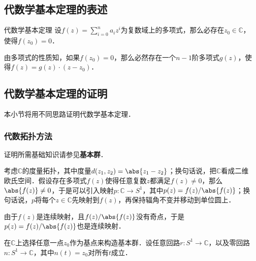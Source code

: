 

\subsection{代数学基本定理的表述}

\begin{definition}{代数学基本定理}
设$f(z)=\sum\limits_{i=0}^n a_iz^i$为复数域上的多项式，那么必存在$z_0\in\mathbb{C}$，使得$f(z_0)=0$．
\end{definition}

由多项式的性质知，如果$f(z_0)=0$，那么必然存在一个$n-1$阶多项式$g(z)$，使得$f(z)=g(z)\cdot(z-z_0)$．

\subsection{代数学基本定理的证明}

本小节将用不同思路证明代数学基本定理．

\subsubsection{代数拓扑方法}
证明所需基础知识请参见\textbf{基本群}．

考虑$\mathbb{C}$的度量拓扑，其中度量$d(z_1, z_2)=\abs{z_1-z_2}$；换句话说，把$\mathbb{C}$看成二维欧氏空间．假设存在多项式$f(z)$使得任意复数$z$都满足$f(z)\not=0$，那么$\abs{f(z)}\not=0$，于是可以引入映射$p:\mathbb{C}\rightarrow S^1$，其中$p(z)=f(z)/\abs{f(z)}$；换句话说，$p$将每个$z\in\mathbb{C}$先映射到$f(z)$，再保持辐角不变并移动到单位圆上．

由于$f(z)$是连续映射，且$f(z)/\abs{f(z)}$没有奇点，于是$p(z)=f(z)/\abs{f(z)}$也是连续映射．

在$\mathbb{C}$上选择任意一点$z_0$作为基点来构造基本群．设任意回路$r:S^1\rightarrow\mathbb{C}$，以及零回路$n:S^1\rightarrow\mathbb{C}$，其中$n(t)=z_0$对所有$t$成立．


